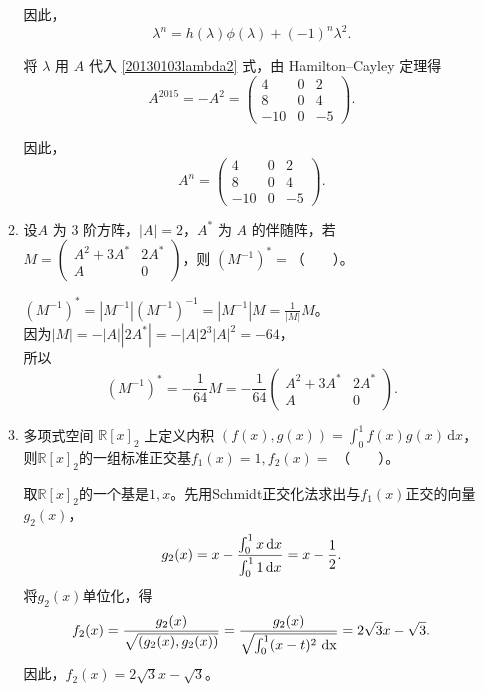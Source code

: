 \begin{enumerate}[1~]
\begin{enumerate}[1.~]
\begin{solution}
因此，
\begin{equation} \label{20130103lambda2}
\lambda^n = h(\lambda)\phi (\lambda) + (-1)^n \lambda^2.
\end{equation}

将 $\lambda$ 用 $A$ 代入  \eqref{20130103lambda2} 式，由 Hamilton--Cayley 定理得
$$
A^{2015} = - A^2 = \left( \begin{matrix}
4&  0&  2\\
8&  0&  4\\
-10&  0&  -5
\end{matrix} \right).
$$

因此，
$$
A^n =  \left( \begin{matrix}
4&  0&  2\\
8&  0&  4\\
-10&  0&  -5
\end{matrix} \right).
$$
\end{solution}

\item
设$A$ 为 $3$ 阶方阵，$|A|=2$，$A^*$ 为 $A$ 的伴随阵，若 $M = \left( \begin{smallmatrix}{ A ^ { 2 } + 3 A ^ { * } } & { 2 A ^ { * } } \\ { A } & { 0 } \end{smallmatrix} \right)$，则 $(M^{-1})^*=$（\ \ \ \ ）。
\begin{solution}
$(M^{-1})^{*} = |M^{-1}| (M^{-1})^{-1} = |M^{-1}| M = \frac{1}{|M|} M$。\\
因为$|M| = -|A||2A^*| = -|A| 2^3 |A|^2 = -64$，\\
所以\[
(M^{-1})^* = -\frac{1}{64}M = -\frac{1}{64} \left( \begin{matrix}
A^2+3A^*&  2A^*\\
A&  0
\end{matrix} \right).
\]
\end{solution}

\item
多项式空间 $\mathbb{R}[x]_2$ 上定义内积 $(f(x), g(x))=\int_0^1 f(x)g(x)\,\mathrm{d}x$，则$\mathbb{R}[x]_2$的一组标准正交基$f_1(x) = 1,f_2 (x)=$ （\ \ \ \ ）。
\begin{solution}
取$\mathbb{R}[x]_2$的一个基是$1, x$。先用Schmidt正交化法求出与$f_1(x)$正交的向量$g_2(x)$，\[
g_2(x) = x-\frac{\int_0^1 x \,{\rm d}x}{\int_0^1 1 \,{\rm d}x} = x-\frac12. \]
将$g_2(x)$单位化，得\[
f_2(x) = \frac{g_2(x)}{\sqrt{(g_2(x), g_2(x))}} = \frac{g_2(x)}{\sqrt{\int_0^1 (x-t)^2 \ {\rm dx}}} = 2 \sqrt{3} x-\sqrt{3}. \]
因此，$f_2(x) = 2 \sqrt{3}x -\sqrt{3}$。
\end{solution}


\end{enumerate}
\end{enumerate}
